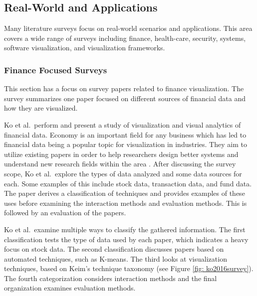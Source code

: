 \subsection{Real-World and Applications}
Many literature surveys focus on real-world scenarios and applications. This area covers a wide range of surveys including finance, health-care, security, systems, software visualization, and visualization frameworks.
\subsubsection{Finance Focused Surveys}
This section has a focus on survey papers related to finance visualization. The survey summarizes one paper focused on different sources of financial data and how they are visualized.

Ko et al.\ perform and present a study of visualization and visual analytics of financial data. Economy is an important field for any business which has led to financial data being a popular topic for visualization in industries. They aim to utilize existing papers in order to help researchers design better systems and understand new research fields within the area \cite{ko2016survey}.
After discussing the survey scope, Ko et al.\ explore the types of data analyzed and some data sources for each. Some examples of this include stock data, transaction data, and fund data. The paper derives a classification of techniques and provides examples of these uses before examining the interaction methods and evaluation methods. This is followed by an evaluation of the papers.

Ko et al.\ examine multiple ways to classify the gathered information. The first classification tests the type of data used by each paper, which indicates a heavy focus on stock data. The second classification discusses papers based on automated techniques, such as K-means. The third looks at visualization techniques, based on Keim's technique taxonomy \cite{keim2002information} (see Figure \ref{fig: ko2016survey}). The fourth categorization considers interaction methods and the final organization examines evaluation methods.

